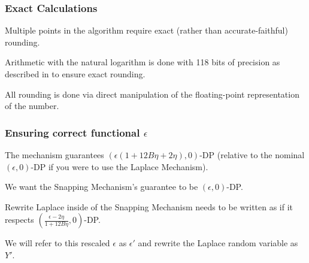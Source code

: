 \documentclass{beamer}
\begin{document}
\begin{frame}
    \frametitle{Exact Calculations}
    Multiple points in the algorithm require exact (rather than accurate-faithful) rounding. \newline

    Arithmetic with the natural logarithm is done with 118 bits of precision as described in \cite{DLM07}
    to ensure exact rounding. \newline

    All rounding is done via direct manipulation of the floating-point representation of the number. \newline
\end{frame}

\begin{frame}
    \frametitle{Ensuring correct functional $\epsilon$}
    The mechanism guarantees  $\left(\epsilon(1 + 12B \eta + 2\eta), 0\right)$-DP
    (relative to the nominal $(\epsilon,0)$-DP if you were to use the Laplace Mechanism). \newline

    We want the Snapping Mechanism's guarantee to be $(\epsilon, 0)$-DP. \newline

    \pause

    Rewrite Laplace inside of the Snapping Mechanism needs to be written as if it respects $\left( \frac{\epsilon - 2 \eta}{1 + 12B \eta}, 0\right)$-DP. \newline

    We will refer to this rescaled $\epsilon$ as $\epsilon'$ and rewrite the Laplace random variable as $Y'$.
\end{frame}
\end{document}
